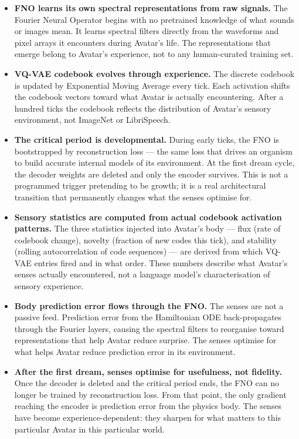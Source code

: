 \documentclass[11pt,a4paper]{article}
\begin{document}
\begin{tcolorbox}[realbox, title={Autonomous Physics: Spectral Sensory Cortex}]
\begin{itemize}
  \item \textbf{FNO learns its own spectral representations from raw signals.} The Fourier
        Neural Operator begins with no pretrained knowledge of what sounds or images mean. It
        learns spectral filters directly from the waveforms and pixel arrays it encounters
        during Avatar's life. The representations that emerge belong to Avatar's experience,
        not to any human-curated training set.
  \item \textbf{VQ-VAE codebook evolves through experience.} The discrete codebook is
        updated by Exponential Moving Average every tick. Each activation shifts the codebook
        vectors toward what Avatar is actually encountering. After a hundred ticks the
        codebook reflects the distribution of Avatar's sensory environment, not ImageNet or
        LibriSpeech.
  \item \textbf{The critical period is developmental.} During early ticks, the
        FNO is bootstrapped by reconstruction loss --- the same loss that drives an organism
        to build accurate internal models of its environment. At the first dream cycle, the
        decoder weights are deleted and only the encoder survives. This is not a programmed
        trigger pretending to be growth; it is a real architectural transition that permanently
        changes what the senses optimise for.
  \item \textbf{Sensory statistics are computed from actual codebook activation patterns.}
        The three statistics injected into Avatar's body --- flux (rate of codebook change),
        novelty (fraction of new codes this tick), and stability (rolling autocorrelation of
        code sequences) --- are derived from which VQ-VAE entries fired and in what order.
        These numbers describe what Avatar's senses actually encountered, not a language
        model's characterisation of sensory experience.
  \item \textbf{Body prediction error flows through the FNO.} The senses are not a passive
        feed. Prediction error from the Hamiltonian ODE back-propagates through the Fourier
        layers, causing the spectral filters to reorganise toward representations that help
        Avatar reduce surprise. The senses optimise for what helps Avatar reduce prediction
        error in its environment.
  \item \textbf{After the first dream, senses optimise for usefulness, not fidelity.} Once
        the decoder is deleted and the critical period ends, the FNO can no longer be trained
        by reconstruction loss. From that point, the only gradient reaching the encoder is
        prediction error from the physics body. The senses have become experience-dependent:
        they sharpen for what matters to this particular Avatar in this particular world.
\end{itemize}
\end{tcolorbox}
\end{document}
